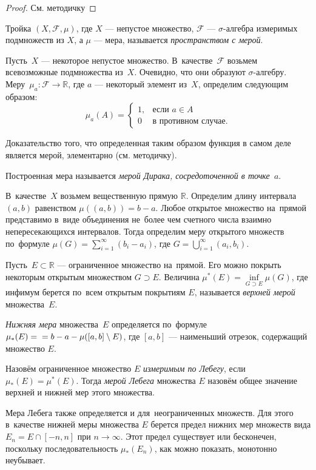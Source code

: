 \begin{proof}
    См. методичку
\end{proof}

\begin{definition}
    Тройка $(X, \mathcal F, \mu)$, где $X$ --- непустое множество, $\mathcal F$
    --- $\sigma$-алгебра измеримых подмножеств из $X$, а $\mu$ --- мера,
    называется \emph{пространством с мерой}.
\end{definition}

\begin{example}
    Пусть~$X$ --- некоторое непустое множество. В~качестве~$\mathcal F$
    возьмем всевозможные подмножества из~$X$. Очевидно, что они образуют
    $\sigma$-алгебру. Меру~$\mu_a \colon \mathcal F \to \mathbb R$, где 
    $a$ --- некоторый элемент из~$X$, определим следующим образом:
    \[ \mu_a(A) = 
        \begin{cases}
            1, & \text{если } a \in A \\
            0 & \text{в противном случае.}
    \end{cases} \]

    Доказательство того, что определенная таким образом функция в самом деле
    является мерой, элементарно (см. методичку).

    Построенная мера называется \emph{мерой Дирака, сосредоточенной в точке~$a$}.
\end{example}

\begin{example}
    В~качестве~$X$ возьмем вещественную прямую $\mathbb R$. Определим длину
    интервала~$(a, b)$ равенством $\mu( (a, b) ) = b - a$. Любое открытое
    множество на~прямой представимо в~виде объединения не~более чем счетного
    числа взаимно непересекающихся интервалов. Тогда определим меру
    открытого множеств по~формуле $\mu(G) = \sum\limits_{i=1}^\infty (b_i -
    a_i)$, где $G = \bigcup\limits_{i=1}^\infty (a_i, b_i)$.

    Пусть~$E \subset \mathbb R$ --- ограниченное множество на~прямой. Его можно
    покрыть некоторым открытым множеством $G \supset E$. Величина $\mu^*(E) =
    \inf\limits_{G \supset E} \mu(G)$, где инфимум берется по~всем открытым покрытиям
    $E$, называется \emph{верхней мерой} множества~$E$.

    \emph{Нижняя мера} множества~$E$ определяется по~формуле $\mu_*(E) = \\ = b - a -
    \mu([a, b] \setminus E)$, где $[a, b]$ --- наименьший отрезок, содержащий
    множество $E$.

    Назовём ограниченное множество $E$ \emph{измеримым по Лебегу}, если $\mu_*(E) =
    \mu^*(E)$. Тогда \emph{мерой Лебега} множества $E$ назовём общее значение
    верхней и нижней мер этого множества.

    Мера Лебега также определяется и для~неограниченных множеств. Для этого в~качестве
    нижней меры множества $E$ берется предел нижних мер множеств вида
    $E_n = E \cap [-n, n]$ при $n \to \infty$. Этот предел существует или бесконечен,
    поскольку последовательность $\mu_*(E_n)$, как можно показать, монотонно неубывает.
\end{example}

